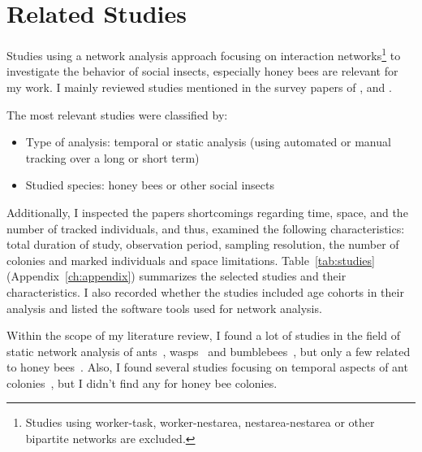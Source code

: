 \section{Related Studies}
\label{ch:relatedwork}

Studies using a network analysis approach focusing on interaction networks\footnote{Studies using worker-task, worker-nestarea, nestarea-nestarea or other bipartite networks are excluded.} to investigate the behavior of social insects, especially honey bees are relevant for my work.
I mainly reviewed studies mentioned in the survey papers of \textcite{Pinter-Wollman2014}, \textcite[chapter~15]{krause2014animal} and \textcite{charbonneau2013social}.

The most relevant studies were classified by:

\begin{itemize}
\item Type of analysis: temporal or static analysis (using automated or manual tracking over a long or short term)
\item Studied species: honey bees or other social insects
\end{itemize}

Additionally, I inspected the papers shortcomings regarding time, space, and the number of tracked individuals, and thus, examined the following characteristics: total duration of study, observation period, sampling resolution, the number of colonies and marked individuals and space limitations.
Table~\ref{tab:studies} (Appendix~\ref{ch:appendix}) summarizes the selected studies and their characteristics.
I also recorded whether the studies included age cohorts in their analysis and listed the software tools used for network analysis.

Within the scope of my literature review, I found a lot of studies in the field of static network analysis of ants~\cite{greenwald2015ant,pinter2011effect,quevillon2015social,formica2012fitness,waters2012information,sendova2010emergency}, wasps~\cite{naug2009structure} and bumblebees~\cite{otterstatter2007contact}, but only a few related to honey bees~\cite{baracchi2014socio,naug2008structure,scholl2011olfactory,naug2007experimentally}.
Also, I found several studies focusing on temporal aspects of ant colonies~\cite{mersch2013tracking,blonder2011time,jeanson2012long}, but I didn't find any for honey bee colonies.

